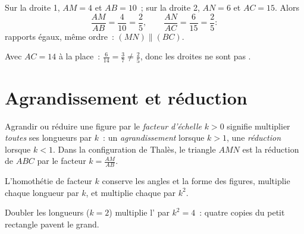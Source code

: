 \begin{example}\label{ex:g9:thales:converse}
Sur la droite 1, $AM = 4$ et $AB = 10$~; sur la droite 2, $AN = 6$ et
$AC = 15$. Alors
\[
\frac{AM}{AB} = \frac{4}{10} = \frac25,
\qquad
\frac{AN}{AC} = \frac{6}{15} = \frac25 :
\]
rapports égaux, même ordre~: $(MN) \parallel (BC)$.

Avec $AC = 14$ à la place~: $\frac{6}{14} = \frac37 \neq \frac25$,
donc les droites ne sont pas .
\end{example}

\section{Agrandissement et réduction}

\begin{definition}\label{def:g9:thales:scaling}
Agrandir ou réduire une figure par le \emph{facteur
d'échelle} $k > 0$ signifie multiplier
\emph{toutes} ses longueurs par $k$~: un \emph{agrandissement} lorsque
$k > 1$, une \emph{réduction} lorsque $k < 1$. Dans la configuration de
Thalès, le triangle $AMN$ est la réduction de $ABC$ par le facteur
$k = \frac{AM}{AB}$.
\end{definition}

\begin{proposition}\label{prop:g9:thales:scaling}
L'homothétie de facteur $k$ conserve les angles et la forme des figures,
multiplie chaque longueur par $k$, et multiplie chaque \emph{} par
$k^2$.
\end{proposition}
\admitted

\begin{omfigure}

{\small Doubler les longueurs ($k = 2$) multiplie l' par
$k^2 = 4$~: quatre copies du petit rectangle pavent le grand.}
\end{omfigure}

